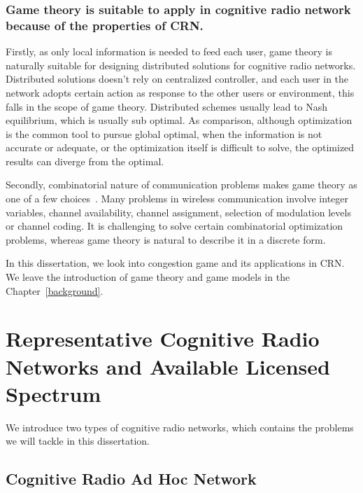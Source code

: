 \subsubsection{Game theory is suitable to apply in cognitive radio network because of the properties of CRN.}
Firstly, as only local information is needed to feed each user, game theory is naturally suitable for designing distributed solutions for cognitive radio networks.
Distributed solutions doesn't rely on centralized controller, and each user in the network adopts certain action as response to the other users or environment, this falls in the scope of game theory.
Distributed schemes usually lead to Nash equilibrium, which is usually sub optimal.
As comparison, although optimization is the common tool to pursue global optimal, when the information is not accurate or adequate, or the optimization itself is difficult to solve, the optimized results can diverge from the optimal.

%
Secondly, combinatorial nature of communication problems makes game theory as one of a few choices~\cite{Han:2008:RAW:1457343}.
Many problems in wireless communication involve integer variables, \ie channel availability, channel assignment, selection of modulation levels or channel coding.
It is challenging to solve certain combinatorial optimization problems, whereas game theory is natural to describe it in a discrete form.


In this dissertation, we look into congestion game and its applications in CRN.
We leave the introduction of game theory and game models in the Chapter~\ref{background}.






\section{Representative Cognitive Radio Networks and Available Licensed Spectrum}
We introduce two types of cognitive radio networks, which contains the problems we will tackle in this dissertation.

\subsection{Cognitive Radio Ad Hoc Network}


